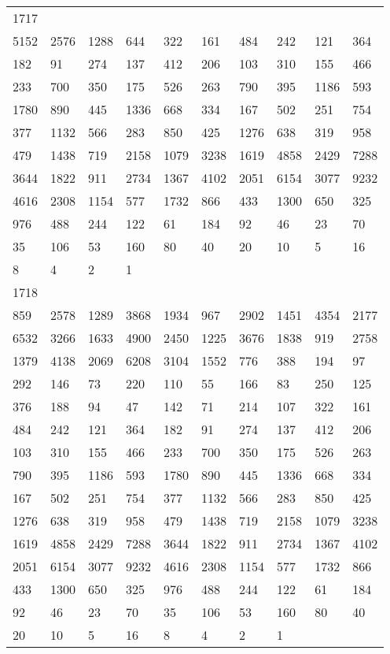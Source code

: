 \begin{longtable}{*{10}{l}}
1717&&&&&&&&&\\
5152& 2576& 1288& 644& 322& 161& 484& 242& 121& 364\\
182& 91& 274& 137& 412& 206& 103& 310& 155& 466\\
233& 700& 350& 175& 526& 263& 790& 395& 1186& 593\\
1780& 890& 445& 1336& 668& 334& 167& 502& 251& 754\\
377& 1132& 566& 283& 850& 425& 1276& 638& 319& 958\\
479& 1438& 719& 2158& 1079& 3238& 1619& 4858& 2429& 7288\\
3644& 1822& 911& 2734& 1367& 4102& 2051& 6154& 3077& 9232\\
4616& 2308& 1154& 577& 1732& 866& 433& 1300& 650& 325\\
976& 488& 244& 122& 61& 184& 92& 46& 23& 70\\
35& 106& 53& 160& 80& 40& 20& 10& 5& 16\\
8& 4& 2& 1& \\

1718&&&&&&&&&\\
859& 2578& 1289& 3868& 1934& 967& 2902& 1451& 4354& 2177\\
6532& 3266& 1633& 4900& 2450& 1225& 3676& 1838& 919& 2758\\
1379& 4138& 2069& 6208& 3104& 1552& 776& 388& 194& 97\\
292& 146& 73& 220& 110& 55& 166& 83& 250& 125\\
376& 188& 94& 47& 142& 71& 214& 107& 322& 161\\
484& 242& 121& 364& 182& 91& 274& 137& 412& 206\\
103& 310& 155& 466& 233& 700& 350& 175& 526& 263\\
790& 395& 1186& 593& 1780& 890& 445& 1336& 668& 334\\
167& 502& 251& 754& 377& 1132& 566& 283& 850& 425\\
1276& 638& 319& 958& 479& 1438& 719& 2158& 1079& 3238\\
1619& 4858& 2429& 7288& 3644& 1822& 911& 2734& 1367& 4102\\
2051& 6154& 3077& 9232& 4616& 2308& 1154& 577& 1732& 866\\
433& 1300& 650& 325& 976& 488& 244& 122& 61& 184\\
92& 46& 23& 70& 35& 106& 53& 160& 80& 40\\
20& 10& 5& 16& 8& 4& 2& 1& \\


\end{longtable}
